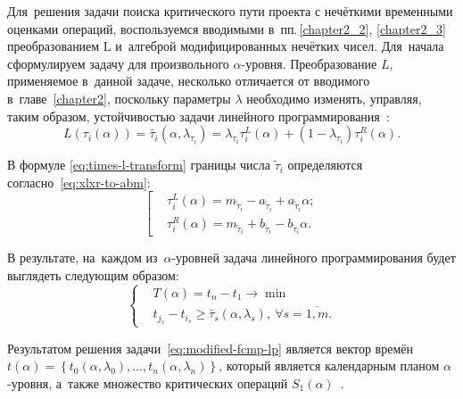 Для~решения задачи поиска критического пути проекта с нечёткими временными оценками операций, воспользуемся вводимыми в~пп.\,\ref{chapter2_2}, \ref{chapter2_3} преобразованием L и~алгеброй модифицированных нечётких чисел. Для~начала сформулируем задачу для произвольного $\alpha$-уровня. Преобразование $L$, применяемое в~данной задаче, несколько отличается от вводимого в~главе~\ref{chapter2}, поскольку параметры $\lambda$ необходимо изменять, управляя, таким образом, устойчивостью задачи линейного программирования~\cite{Vorontsov_VSTU}:
\begin{equation}
\label{eq:times-l-transform}
  L(\tau_i(\alpha ))=\bar{\tau}_i\left(\alpha, \lambda_{\tau_i}\right)=\lambda_{\tau_i}\tau_{i}^{L}\left(\alpha \right)+(1-\lambda_{\tau_i})\tau_{i}^{R}\left(\alpha \right).
\end{equation}

В формуле \eqref{eq:times-l-transform} границы числа $\tilde \tau_i$ определяются согласно~\eqref{eq:xlxr-to-abm}:
\begin{equation*}
  \left[ \begin{aligned}
    & \tau_{i}^{L}\left(\alpha \right)=m_{\tilde \tau_i}-a_{\tilde \tau_i}+a_{\tilde \tau_i}\alpha; \\ 
    & \tau_{i}^{R}\left(\alpha \right)={{m}_{{{{\tilde{\tau }}}_{i}}}}+{{b}_{{{{\tilde{\tau }}}_{i}}}}-{{b}_{{{{\tilde{\tau }}}_{i}}}}\alpha.
  \end{aligned} \right.
\end{equation*}

В результате, на~каждом из~$\alpha$-уровней задача линейного программирования будет выглядеть следующим образом:
\begin{equation}
\label{eq:modified-fcpm-lp}
  \left\{ \begin{aligned}
    & T(\alpha )=t_n-t_1\to \min  \\ 
    & t_{j_s}-t_{i_s}\geqslant \bar{\tau}_s\left(\alpha,\lambda_s \right),\ \forall s=\overline{1,m}.
  \end{aligned} \right.
\end{equation}

Результатом решения задачи~\eqref{eq:modified-fcmp-lp} является вектор времён $t\left( \alpha \right)=\left\{ t_0\left(\alpha, \lambda_0\right),\ldots,t_n\left(\alpha, \lambda_n\right) \right\}$, который является календарным планом $\alpha$-уровня, а~также множество критических операций $S_1\left( \alpha \right)$~\cite{Vorontsov_VSTU}. 

